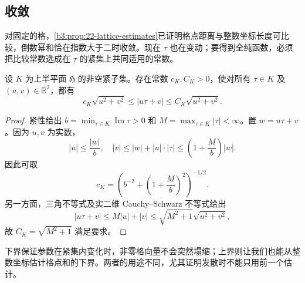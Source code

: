 \subsection{收敛}
\label{b3:subsec:230202}

对固定的格，\cref{b3:prop:22-lattice-estimates}已证明格点距离与整数坐标长度可比较，倒数幂和恰在指数大于二时收敛。现在 \(\tau\) 也在变动；要得到全纯函数，必须把比较常数选成在 \(\tau\) 的紧集上共同适用的常数。

\begin{lemma}[格坐标的一致比较]\label{b3:lem:23-lattice-uniform-bound}
设 \(K\) 为上半平面 \(\mathfrak H\) 的非空紧子集。存在常数 \(c_K,C_K>0\)，使对所有 \(\tau\in K\) 及 \((u,v)\in\mathbb R^2\)，都有
\begin{equation}\label{b3:eq:23-lattice-uniform-bound}
 c_K\sqrt{u^2+v^2}\le |u\tau+v|
 \le C_K\sqrt{u^2+v^2}.
\end{equation}
\end{lemma}
\begin{proof}
紧性给出 \(b=\min_{\tau\in K}\operatorname{Im}\tau>0\) 和 \(M=\max_{\tau\in K}|\tau|<\infty\)。置 \(w=u\tau+v\)。因为 \(u,v\) 为实数，
\[
 |u|\le\frac{|w|}{b},\quad
 |v|\le |w|+|u|\cdot|\tau|
 \le\left(1+\frac Mb\right)|w|.
\]
因此可取
\[
 c_K=\left(b^{-2}+\left(1+\frac Mb\right)^2\right)^{-1/2}.
\]
另一方面，三角不等式及实二维 Cauchy--Schwarz 不等式给出
\[
 |u\tau+v|\le M|u|+|v|
 \le\sqrt{M^2+1}\sqrt{u^2+v^2},
\]
故 \(C_K=\sqrt{M^2+1}\) 满足要求。
\end{proof}

下界保证参数在紧集内变化时，非零格向量不会突然塌缩；上界则让我们也能从整数坐标估计格点和的下界。两者的用途不同，尤其证明发散时不能只用前一个估计。

